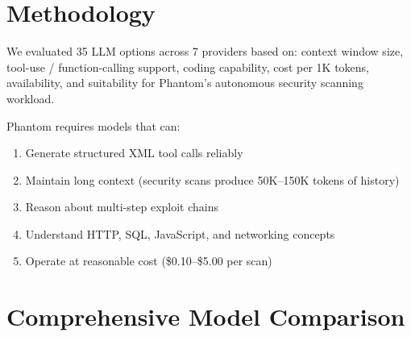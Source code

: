 \documentclass[12pt,a4paper]{report}
\begin{document}
\section{Methodology}
We evaluated 35 LLM options across 7 providers based on: context window size,
tool-use / function-calling support, coding capability, cost per 1K tokens,
availability, and suitability for Phantom's autonomous security scanning workload.

Phantom requires models that can:
\begin{enumerate}[noitemsep]
  \item Generate structured XML tool calls reliably
  \item Maintain long context (security scans produce 50K--150K tokens of history)
  \item Reason about multi-step exploit chains
  \item Understand HTTP, SQL, JavaScript, and networking concepts
  \item Operate at reasonable cost (\$0.10--\$5.00 per scan)
\end{enumerate}

\section{Comprehensive Model Comparison}
\end{document}
